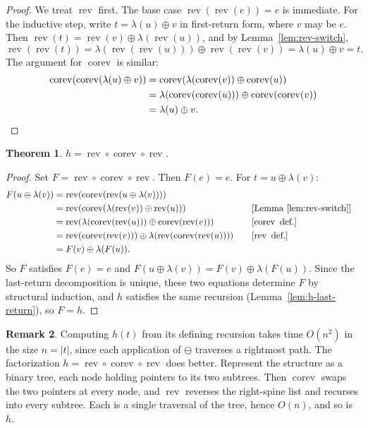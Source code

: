 \documentclass[a4paper,11pt]{article}
\newtheorem{theorem}{Theorem}[section]
\theoremstyle{definition}
\newtheorem{remark}[theorem]{Remark}
\DeclareMathOperator{\rev}{rev}
\DeclareMathOperator{\corev}{corev}
\begin{document}
\begin{proof}
  We treat $\rev$ first. The base case $\rev(\rev(e)) = e$ is immediate. For the
  inductive step, write $t = \lambda(u) \oplus v$ in first-return form, where
  $v$ may be $e$. Then
  $\rev(t) = \rev(v) \oplus \lambda(\rev(u))$, and by
  Lemma~\ref{lem:rev-switch},
\[
\rev(\rev(t))
  = \lambda(\rev(\rev(u))) \oplus \rev(\rev(v))
  = \lambda(u) \oplus v = t.
\]
The argument for $\corev$ is similar:
\begin{align*}
\corev(\corev(\lambda(u) \oplus v))
  &= \corev(\lambda(\corev(v)) \oplus \corev(u)) \\
  &= \lambda(\corev(\corev(u))) \oplus \corev(\corev(v)) \\
  &= \lambda(u) \oplus v. \qedhere
\end{align*}
\end{proof}

\begin{theorem}\label{thm:h-factorization}
$h = \rev \circ \corev \circ \rev$.
\end{theorem}

\begin{proof}
Set $F = \rev \circ \corev \circ \rev$. Then
$F(e) = e$. For $t = u \oplus \lambda(v)$:
\begin{align*}
  F(u \oplus \lambda(v))
    &= \rev(\corev(
         \rev(u \oplus \lambda(v)))) \\
    &= \rev(\corev(
         \lambda(\rev(v))
           \oplus \rev(u)))
      &\quad&[\text{Lemma~\ref{lem:rev-switch}}] \\
    &= \rev(
         \lambda(\corev(\rev(u)))
         \oplus \corev(\rev(v)))
      &&[\corev\text{ def.}] \\
    &= \rev(\corev(\rev(v)))
       \oplus
       \lambda(\rev(\corev(
         \rev(u))))
      &&[\rev\text{ def.}] \\
    &= F(v) \oplus \lambda(F(u)).
\end{align*}
So $F$ satisfies $F(e) = e$ and
$F(u \oplus \lambda(v)) = F(v) \oplus \lambda(F(u))$.
Since the last-return decomposition is unique, these two
equations determine $F$ by structural induction, and $h$
satisfies the same recursion
(Lemma~\ref{lem:h-last-return}), so $F = h$.
\end{proof}

\begin{remark}
Computing $h(t)$ from its defining recursion takes time $O(n^2)$ in the size
$n = |t|$, since each application of $\ominus$ traverses a rightmost path. The
factorization $h = \rev \circ \corev \circ \rev$ does better. Represent the
structure as a binary tree, each node holding pointers to its two subtrees. Then
$\corev$ swaps the two pointers at every node, and $\rev$ reverses the right-spine
list and recurses into every subtree. Each is a single traversal of the tree,
hence $O(n)$, and so is $h$.
\end{remark}
\end{document}
